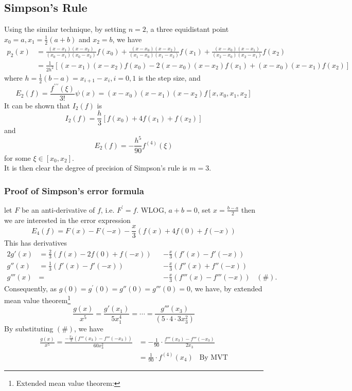 \documentclass[12pt]{article}
\theoremstyle{definition}
\begin{document}
\subsection{Simpson's Rule}
Using the similar technique, by setting $n=2$, a three equidistant point $x_0=a, x_1=\frac{1}{2}(a+b)$ and $x_2=b$, we have
\begin{align*}
p_2(x)&=\frac{(x-x_1)(x-x_2)}{(x_0-x_1)(x_0-x_2)}f(x_0)+\frac{(x-x_0)(x-x_2)}{(x_1-x_0)(x_1-x_2)}f(x_1)+\frac{(x-x_0)(x-x_1)}{(x_2-x_0)(x_2-x_1)}f(x_2)\\
&=\frac{1}{2h^2}[(x-x_1)(x-x_2)f(x_0)-2(x-x_0)(x-x_2)f(x_1)+(x-x_0)(x-x_1)f(x_2)]
\end{align*}
where $h=\frac{1}{2}(b-a)=x_{i+1}-x_i, i=0,1$ is the step size, and
\[
E_2(f)=\frac{f^{\prime\prime\prime}(\xi)}{3!}\psi(x)=(x-x_0)(x-x_1)(x-x_2)f[x,x_0,x_1,x_2]
\]
It can be shown that $I_2(f)$ is
\[
I_2(f)=\frac{h}{3}[f(x_0)+4f(x_1)+f(x_2)]
\]
and
\[
E_2(f)=-\frac{h^5}{90}f^{(4)}(\xi)
\]
for some $\xi\in[x_0,x_2]$.\\
It is then clear the degree of precision of Simpson's rule is $m=3$.
\subsubsection{Proof of Simpson's error formula}
let $F$ be an anti-derivative of $f$, i.e. $F^\prime = f$. WLOG, $a+b=0$, set $x=\frac{b-a}{2}$ then we are interested in the error expression
\[
E_4(f)=F(x)-F(-x)-\frac{x}{3}(f(x)+4f(0)+f(-x))
\]
This has derivatives
\begin{alignat}{2}
g'(x)&=\frac23(f(x)-2f(0)+f(-x))&&-\frac x3 (f'(x)-f'(-x))
\\
g''(x)&=\frac13(f'(x)-f'(-x))&&-\frac x3(f''(x)+f''(-x))
\\
g'''(x)&=&&-\frac x3(f'''(x)-f'''(-x))\;\;\;(\#).
\end{alignat}
Consequently, as $g(0)=g^\prime(0)=g''(0)=g'''(0)=0$, we have, by extended mean value theorem\footnote{Extended mean value theorem: }
\[
\frac{g(x)}{x^5}=\frac{g'(x_1)}{5x_1^4}=\cdots =\frac{g'''(x_3)}{(5\cdot4\cdot3x_3^2)}
\]
By substituting $(\#)$, we have
\begin{align*}
\frac{g(x)}{x^5}=\frac{-\frac{x_3}{3}(f'''(x_3)-f'''(-x_3))}{60x_3^2}&=-\frac{1}{90}\cdot\frac{f'''(x_3)-f'''(-x_3)}{2x_3}\\
&=\frac{1}{90}\cdot f^{(4)}(x_4)\;\;\;\text{By MVT}
\end{align*}
\end{document}
